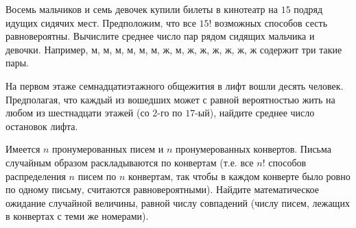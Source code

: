 \begin{comment}
\begin{problem}
В каждую $i$-ую единицу времени живая клетка получает случайную дозу облучения $X_i$, причем $\{ X_i\}_{i=1}^{t}$ имеют 
одинаковую функцию распределения $F_X(x)$ и независимы в совокупности $\forall t$. Получив интегральную дозу облучения, 
равную $\nu$, клетка погибает. Оценить среднее время жизни клетки ${\mathbb E}T$. 
\end{problem}

\begin{ordre}

Показать тождество Вальда: 
$$
{\mathbb E}S_T={\mathbb E}X\cdot {\mathbb E}T, 
$$

введя вспомогательную случайную величину

$$
Y_j=\begin{cases}
1, &\text{ если }\quad X_1+\ldots +X_{j-1}=S_{j-1}<\nu, \\
0, &\text{ в остальных случаях }. 
\end{cases}
$$
 

\end{ordre}

\end{comment}


\begin{problem}
Восемь мальчиков и семь девочек купили билеты в кинотеатр на $15$ подряд идущих сидячих мест. Предположим, что все $15!$ 
возможных способов сесть равновероятны. Вычислите среднее число пар рядом сидящих мальчика и девочки. Например, 
м, м, м, м, м, м, ж, м, ж, ж, ж, ж, ж, ж содержит три такие пары. 
\end{problem}


\begin{problem}
На первом этаже семнадцатиэтажного общежития в лифт вошли десять человек. Предполагая, что каждый из вошедших может с равной вероятностью 
жить на любом из шестнадцати этажей (со $2$-го по $17$-ый), найдите среднее число остановок лифта. 
\end{problem}



\begin{problem}
Имеется $n$ пронумерованных писем и $n$ пронумерованных конвертов. Письма случайным образом раскладываются по конвертам (т.е. все $n!$ 
способов распределения $n$ писем по $n$ конвертам, так чтобы в каждом конверте было ровно по одному письму, считаются равновероятными). 
Найдите математическое ожидание случайной величины, равной числу совпадений (числу писем, лежащих в конвертах с теми же номерами). 
\end{problem}

